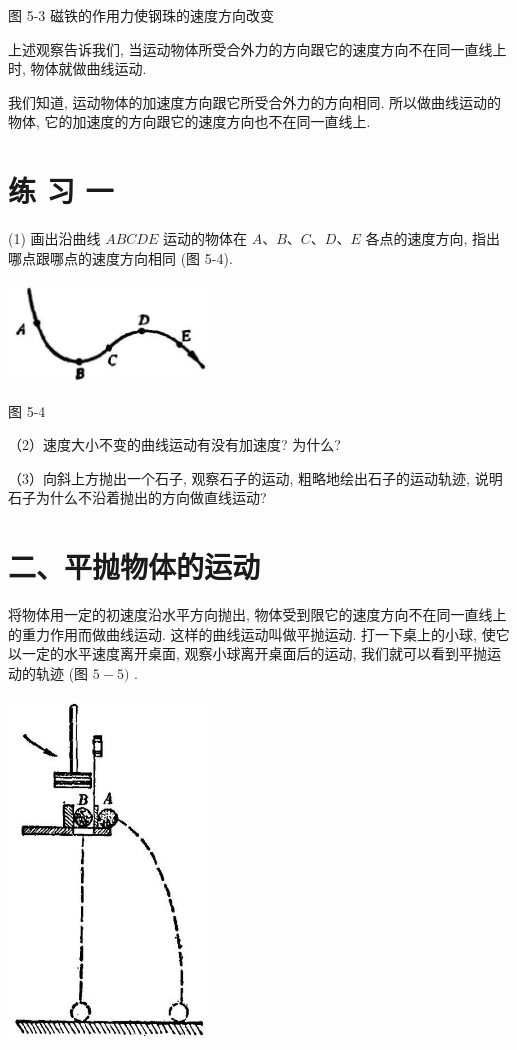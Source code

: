 \documentclass[10pt]{article}
\begin{document}
图 5-3 磁铁的作用力使钢珠的速度方向改变

上述观察告诉我们, 当运动物体所受合外力的方向跟它的速度方向不在同一直线上时, 物体就做曲线运动.

我们知道, 运动物体的加速度方向跟它所受合外力的方向相同. 所以做曲线运动的物体, 它的加速度的方向跟它的速度方向也不在同一直线上.

\section*{练 习 一}

(1) 画出沿曲线 \({ABCDE}\) 运动的物体在 \(A\text{、}B\text{、}C\text{、}D\text{、}E\) 各点的速度方向, 指出哪点跟哪点的速度方向相同 (图 5-4).

\begin{center}
\includegraphics[max width=0.4\textwidth]{images/01912d55-147c-70aa-b0e0-1782a122f948_132_106900.jpg}
\end{center}

图 5-4

（2）速度大小不变的曲线运动有没有加速度? 为什么?

（3）向斜上方抛出一个石子, 观察石子的运动, 粗略地绘出石子的运动轨迹, 说明石子为什么不沿着抛出的方向做直线运动?

\section*{二、平抛物体的运动}

将物体用一定的初速度沿水平方向抛出, 物体受到限它的速度方向不在同一直线上的重力作用而做曲线运动. 这样的曲线运动叫做平抛运动. 打一下桌上的小球, 使它以一定的水平速度离开桌面, 观察小球离开桌面后的运动, 我们就可以看到平抛运动的轨迹 (图 \(5 - 5)\) .

\begin{center}
\includegraphics[max width=0.4\textwidth]{images/01912d55-147c-70aa-b0e0-1782a122f948_133_516657.jpg}
\end{center}
\end{document}
